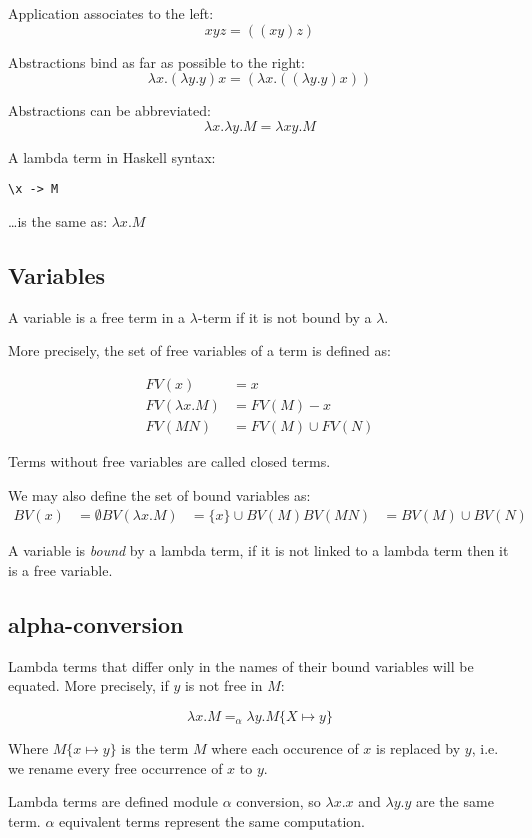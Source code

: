 Application associates to the left:
$$
xyz = ((xy)z)
$$

Abstractions bind as far as possible to the right:
$$
\lambda x.(\lambda y.y)x = (\lambda x.((\lambda y.y)x))
$$

Abstractions can be abbreviated:
$$
\lambda x.\lambda y.M = \lambda xy.M
$$

A lambda term in Haskell syntax:
\begin{lstlisting}
\x -> M
\end{lstlisting}

\ldots is the same as: $\lambda x.M$

\subsection{Variables}
A variable is a free term in a $\lambda$-term if it is not bound by a $\lambda$.

More precisely, the set of free variables of a term is defined as:

\begin{align}
FV(x) &= {x} \\
FV(\lambda x.M) &= FV(M)-{x} \\
FV(MN) &= FV(M) \cup FV(N)
\end{align}


Terms without free variables are called closed terms.

We may also define the set of bound variables as:
\begin{align}
BV(x)&=\emptyset
BV(\lambda x.M)&=\{x\}\cup BV(M)
BV(MN) &= BV(M)\cup BV(N)
\end{align}

A variable is \textit{bound} by a lambda term, if it is not linked to a lambda term then it is
a free variable.

\subsection{alpha-conversion}
Lambda terms that differ only in the names of their bound variables will be equated. More precisely, if $y$ is not free in $M$:

$$
\lambda x.M =_\alpha \lambda y.M\{X\mapsto y\}
$$

Where $M\{x\mapsto y\}$ is the term $M$ where each occurence of $x$ is replaced by $y$,
i.e. we rename every free occurrence of $x$ to $y$.

Lambda terms are defined module $\alpha$ conversion, so $\lambda x.x$ and $\lambda y.y$ are the same term.
$\alpha$ equivalent terms represent the same computation.

